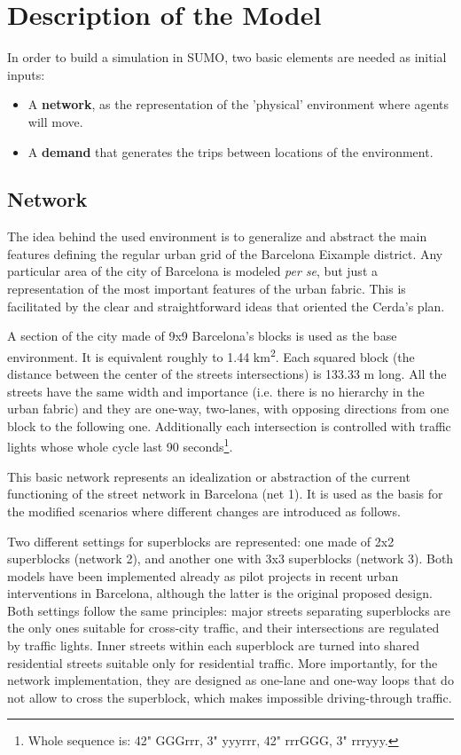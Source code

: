 \documentclass[11pt]{article}
\begin{document}
\section{Description of the Model}

In order to build a simulation in SUMO, two basic elements are needed as initial inputs:
\begin{itemize}
\setlength\itemsep{0.05em}
    \item A \textbf{network}, as the representation of the 'physical' environment where agents will move.
    \item  A \textbf{demand} that generates the trips between locations of the environment.
\end{itemize}

\subsection {Network}

The idea behind the used environment is to generalize and abstract the main features defining the regular urban grid of the Barcelona Eixample district. Any particular area of the city of Barcelona is modeled \textit{per se}, but just a representation of the most important features of the urban fabric. This is facilitated by the clear and straightforward ideas that oriented the Cerda's plan.

A section of the city made of 9x9 Barcelona's blocks is used as the base environment. It is equivalent roughly to 1.44 km\textsuperscript{2}. Each squared block (the distance between the center of the streets intersections) is 133.33 m long. All the streets have the same width and importance (i.e. there is no hierarchy in the urban fabric) and they are one-way, two-lanes, with opposing directions from one block to the following one. Additionally each intersection is controlled with traffic lights whose whole cycle last 90 seconds\footnote{Whole sequence is: 42" GGGrrr, 3" yyyrrr, 42" rrrGGG, 3" rrryyy.}.

This basic network represents an idealization or abstraction of the current functioning of the street network in Barcelona (net 1). It is used as the basis for the modified scenarios where different changes are introduced as follows.

Two different settings for superblocks are represented: one made of 2x2 superblocks (network 2), and another one with 3x3 superblocks (network 3). Both models have been implemented already as pilot projects in recent urban interventions in Barcelona, although the latter is the original proposed design. Both settings follow the same principles: major streets separating superblocks are the only ones suitable for cross-city traffic, and their intersections are regulated by traffic lights. Inner streets within each superblock are turned into shared residential streets suitable only for residential traffic. More importantly, for the network implementation, they are designed as one-lane and one-way loops that do not allow to cross the superblock, which makes impossible driving-through traffic.
\end{document}
